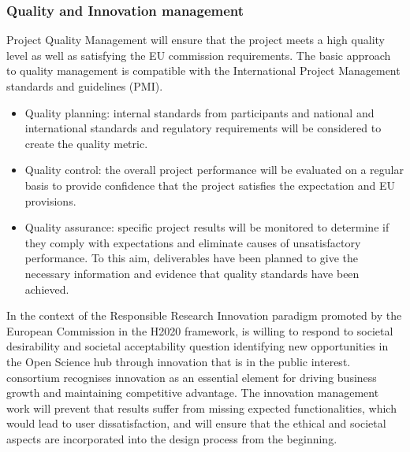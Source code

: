 \subsubsection{Quality and Innovation management}

\TheProject Project Quality Management will ensure that
the project meets a high quality level as well as satisfying the EU commission
requirements. The basic approach to quality management is compatible with the
International Project Management standards and guidelines (PMI).

\begin{itemize}
\item Quality planning: internal standards from participants and national and international standards and
regulatory requirements will be considered to create the quality metric.
\item Quality control: the overall project performance will be evaluated on a regular basis to provide
confidence that the project satisfies the expectation and EU provisions.
\item Quality assurance: specific project results will be monitored to determine if they comply with
expectations and eliminate causes of unsatisfactory performance. To this aim, deliverables have been
planned to give the necessary information and evidence that quality standards have been achieved.
\end{itemize}

In the context of the Responsible Research Innovation paradigm promoted by the European Commission in
the H2020 framework, \TheProject is willing to respond to societal desirability and societal acceptability
question identifying new opportunities in the Open Science hub through innovation that is in the public
interest. \TheProject consortium recognises innovation as an essential element for driving business growth
and maintaining competitive advantage. The innovation management work will prevent that \TheProject
results suffer from missing expected functionalities, which would lead to user dissatisfaction, and will
ensure that the ethical and societal aspects are incorporated into the design process from the beginning.




